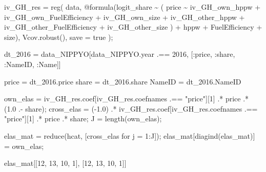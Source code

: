 \documentclass[
  letterpaper,
  DIV=11,
  numbers=noendperiod]{scrreprt}
\newenvironment{Shaded}{\begin{snugshade}}{\end{snugshade}}
\newcommand{\ConstantTok}[1]{\textcolor[rgb]{0.56,0.35,0.01}{#1}}
\newcommand{\FloatTok}[1]{\textcolor[rgb]{0.68,0.00,0.00}{#1}}
\newcommand{\FunctionTok}[1]{\textcolor[rgb]{0.28,0.35,0.67}{#1}}
\newcommand{\NormalTok}[1]{\textcolor[rgb]{0.00,0.23,0.31}{#1}}
\newcommand{\OperatorTok}[1]{\textcolor[rgb]{0.37,0.37,0.37}{#1}}
\newcommand{\PreprocessorTok}[1]{\textcolor[rgb]{0.68,0.00,0.00}{#1}}
\newcommand{\StringTok}[1]{\textcolor[rgb]{0.13,0.47,0.30}{#1}}
\begin{document}
\begin{Shaded}
\begin{Highlighting}[]
\NormalTok{iv\_GH\_res }\OperatorTok{=} \FunctionTok{reg}\NormalTok{(}
\NormalTok{    data, }
    \PreprocessorTok{@formula}\NormalTok{(logit\_share }\OperatorTok{\textasciitilde{}}\NormalTok{ (}
\NormalTok{        price }\OperatorTok{\textasciitilde{}}\NormalTok{ iv\_GH\_own\_hppw }\OperatorTok{+}\NormalTok{ iv\_GH\_own\_FuelEfficiency }\OperatorTok{+}\NormalTok{ iv\_GH\_own\_size }\OperatorTok{+} 
\NormalTok{            iv\_GH\_other\_hppw }\OperatorTok{+}\NormalTok{ iv\_GH\_other\_FuelEfficiency }\OperatorTok{+}\NormalTok{ iv\_GH\_other\_size}
\NormalTok{    ) }\OperatorTok{+}\NormalTok{ hppw }\OperatorTok{+}\NormalTok{ FuelEfficiency }\OperatorTok{+}\NormalTok{ size),}
\NormalTok{    Vcov.}\FunctionTok{robust}\NormalTok{(),}
\NormalTok{    save }\OperatorTok{=} \ConstantTok{true}
\NormalTok{);}

\NormalTok{dt\_2016 }\OperatorTok{=}\NormalTok{ data\_NIPPYO[data\_NIPPYO.year }\OperatorTok{.==} \FloatTok{2016}\NormalTok{, [}\OperatorTok{:}\NormalTok{price, }\OperatorTok{:}\NormalTok{share, }\OperatorTok{:}\NormalTok{NameID, }\OperatorTok{:}\NormalTok{Name]]}

\NormalTok{price }\OperatorTok{=}\NormalTok{ dt\_2016.price}
\NormalTok{share }\OperatorTok{=}\NormalTok{ dt\_2016.share}
\NormalTok{NameID }\OperatorTok{=}\NormalTok{ dt\_2016.NameID}

\NormalTok{own\_elas }\OperatorTok{=}\NormalTok{ iv\_GH\_res.coef[iv\_GH\_res.coefnames }\OperatorTok{.==} \StringTok{"price"}\NormalTok{][}\FloatTok{1}\NormalTok{] }\OperatorTok{.*}\NormalTok{ price }\OperatorTok{.*}\NormalTok{ (}\FloatTok{1.0} \OperatorTok{.{-}}\NormalTok{ share);}
\NormalTok{cross\_elas }\OperatorTok{=}\NormalTok{ (}\OperatorTok{{-}}\FloatTok{1.0}\NormalTok{) }\OperatorTok{.*}\NormalTok{ iv\_GH\_res.coef[iv\_GH\_res.coefnames }\OperatorTok{.==} \StringTok{"price"}\NormalTok{][}\FloatTok{1}\NormalTok{] }\OperatorTok{.*}\NormalTok{ price }\OperatorTok{.*}\NormalTok{ share;}
\NormalTok{J }\OperatorTok{=} \FunctionTok{length}\NormalTok{(own\_elas);}

\NormalTok{elas\_mat }\OperatorTok{=} \FunctionTok{reduce}\NormalTok{(hcat, [cross\_elas for j }\OperatorTok{=} \FloatTok{1}\OperatorTok{:}\NormalTok{J]);}
\NormalTok{elas\_mat[}\FunctionTok{diagind}\NormalTok{(elas\_mat)] }\OperatorTok{=}\NormalTok{ own\_elas;}

\NormalTok{elas\_mat[[}\FloatTok{12}\NormalTok{, }\FloatTok{13}\NormalTok{, }\FloatTok{10}\NormalTok{, }\FloatTok{1}\NormalTok{], [}\FloatTok{12}\NormalTok{, }\FloatTok{13}\NormalTok{, }\FloatTok{10}\NormalTok{, }\FloatTok{1}\NormalTok{]]}
\end{Highlighting}
\end{Shaded}
\end{document}
